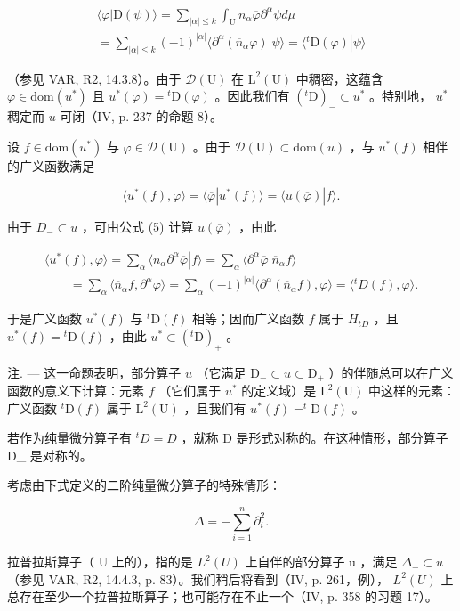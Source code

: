 \[
\begin{array}{c} \langle \varphi | \mathrm{D} (\psi) \rangle = \sum_ {| \alpha | \leqslant k} \int_ {\mathrm{U}} n _ {\alpha} \overline {{\varphi}} \partial^ {\alpha} \psi d \mu \\ = \sum_ {| \alpha | \leqslant k} (- 1) ^ {| \alpha |} \langle \partial^ {\alpha} (\overline {{n}} _ {\alpha} \varphi) | \psi \rangle = \langle {} ^ {t} \mathrm{D} (\varphi) | \psi \rangle \end{array}
\]

（参见 VAR, R2, 14.3.8）。由于 \(\mathcal{D}(\mathrm{U})\) 在 \(\mathrm{L}^2 (\mathrm{U})\) 中稠密，这蕴含 \(\varphi \in \mathrm{dom}(u^{*})\) 且 \(u^{*}(\varphi) = {}^{t}\mathrm{D}(\varphi)\) 。因此我们有 \(({}^{t}\mathrm{D})_{-}\subset u^{*}\) 。特别地， \(u^{*}\) 稠定而 \(u\) 可闭（IV, p. 237 的命题 8）。

设 \(f \in \mathrm{dom}(u^{*})\) 与 \(\varphi \in \mathcal{D}(\mathrm{U})\) 。由于 \(\mathcal{D}(\mathrm{U}) \subset \mathrm{dom}(u)\) ，与 \(u^{*}(f)\) 相伴的广义函数满足

\[
\langle u ^ {*} (f), \varphi \rangle = \langle \overline {{\varphi}} | u ^ {*} (f) \rangle = \langle u (\overline {{\varphi}}) | f \rangle .
\]

由于 \(D_{-} \subset u\) ，可由公式 (5) 计算 \(u(\overline{\varphi})\) ，由此

\[
\begin{array}{l} \langle u ^ {*} (f), \varphi \rangle = \sum_ {\alpha} \langle n _ {\alpha} \partial^ {\alpha} \overline {{\varphi}} | f \rangle = \sum_ {\alpha} \langle \partial^ {\alpha} \overline {{\varphi}} | \overline {{n}} _ {\alpha} f \rangle \\ \qquad = \sum_ {\alpha} \langle \overline {{n}} _ {\alpha} f, \partial^ {\alpha} \varphi \rangle = \sum_ {\alpha} (- 1) ^ {| \alpha |} \langle \partial^ {\alpha} (\overline {{n}} _ {\alpha} f), \varphi \rangle = \langle {} ^ {t} D (f), \varphi \rangle . \end{array}
\]

于是广义函数 \(u^{*}(f)\) 与 \({}^{t}\mathrm{D}(f)\) 相等；因而广义函数 \(f\) 属于 \(H_{tD}\) ，且 \(u^{*}(f)={}^{t}\mathrm{D}(f)\) ，由此 \(u^{*}\subset({}^{t}\mathrm{D})_{+}\) 。

注. --- 这一命题表明，部分算子 \(u\) （它满足 \(\mathrm{D}_{-} \subset u \subset \mathrm{D}_{+}\) ）的伴随总可以在广义函数的意义下计算：元素 \(f\) （它们属于 \(u^{*}\) 的定义域）是 \(\mathrm{L}^{2}(\mathrm{U})\) 中这样的元素：广义函数 \(^{t}\mathrm{D}(f)\) 属于 \(\mathrm{L}^{2}(\mathrm{U})\) ，且我们有 \(u^{*}(f) = ^{t}\mathrm{D}(f)\) 。

若作为纯量微分算子有 \({}^{t}D = D\) ，就称 D 是形式对称的。在这种情形，部分算子 D\_ 是对称的。

考虑由下式定义的二阶纯量微分算子的特殊情形：

\[
\Delta = - \sum_ {i = 1} ^ {n} \partial_ {i} ^ {2}.
\]

拉普拉斯算子（ U 上的），指的是 \(L^{2}(U)\) 上自伴的部分算子 u ，满足 \(\Delta_{-} \subset u\) （参见 VAR, R2, 14.4.3, p. 83）。我们稍后将看到（IV, p. 261，例）， \(L^{2}(U)\) 上总存在至少一个拉普拉斯算子；也可能存在不止一个（IV, p. 358 的习题 17）。
\relax{}
